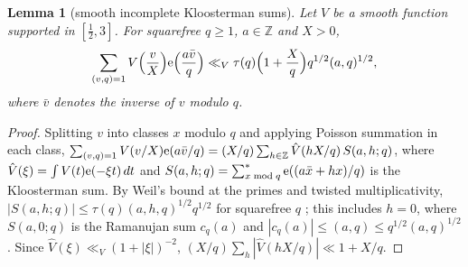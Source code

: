 \documentclass[11pt,a4paper]{article}
\newtheorem{lemma}[theorem]{Lemma}
\theoremstyle{remark}\newtheorem{remark}[theorem]{Remark}
\newcommand{\Z}{\mathbb{Z}}\newcommand{\Q}{\mathbb{Q}}\newcommand{\F}{\mathbb{F}}\newcommand{\R}{\mathbb{R}}
\begin{document}
\begin{lemma}[smooth incomplete Kloosterman sums]\label{lem:kloost}
Let $V$ be a smooth function supported in $[\tfrac12,3]$. For squarefree $q\ge1$, $a\in\Z$ and $X>0$,
\[
\sum_{(v,q)=1}V\Bigl(\frac vX\Bigr)\mathrm{e}\Bigl(\frac{a\bar v}q\Bigr)\ll_V\tau(q)\Bigl(1+\frac Xq\Bigr)q^{1/2}(a,q)^{1/2},
\]
where $\bar v$ denotes the inverse of $v$ modulo $q$.
\end{lemma}
\begin{proof}
Splitting $v$ into classes $x$ modulo $q$ and applying Poisson summation in each class,
$\sum_{(v,q)=1}V(v/X)\e(a\bar v/q)=(X/q)\sum_{h\in\Z}\hat V(hX/q)\,S(a,h;q)$, where $\hat V(\xi)=\int V(t)\mathrm{e}(-\xi t)\,dt$ and
$S(a,h;q)=\sum^\ast_{x\bmod q}\mathrm{e}((a\bar x+hx)/q)$ is the Kloosterman sum. By Weil's bound at the primes and twisted multiplicativity,
$|S(a,h;q)|\le\tau(q)(a,h,q)^{1/2}q^{1/2}$ for squarefree $q$ \cite[Corollary~11.12]{IwaniecKowalski2004}; this includes $h=0$, where
$S(a,0;q)$ is the Ramanujan sum $c_q(a)$ and $|c_q(a)|\le(a,q)\le q^{1/2}(a,q)^{1/2}$. Since $\hat V(\xi)\ll_V(1+|\xi|)^{-2}$,
$(X/q)\sum_h|\hat V(hX/q)|\ll1+X/q$.
\end{proof}
\end{document}
